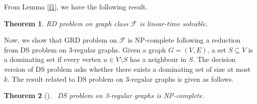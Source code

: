 \documentclass[preprint,12pt]{elsarticle}
\newcommand{\ds}{{\sc Dominating Set}}
\newtheorem{theorem}{Theorem}[section]
\begin{document}
From Lemma \ref{f1}, we have the following result.
\begin{theorem}
    RD problem on graph class $\mathcal{F}$ is linear-time solvable.
\end{theorem}
Now, we show that GRD problem on  $\mathcal{F}$ is NP-complete following a reduction from DS problem on $3$-regular graphs. Given a graph $G = (V, E)$, a set $S \subseteq V$ is a dominating set if every vertex $u \in V\setminus S$ has a neighbour in $S$. The decision version of DS problem asks whether there exists a dominating set of size at most $k$.
The result related to DS problem on 3-regular graphs is given as follows.
\begin{theorem}[\cite{Kikuno}]~\label{ds_3r}
    DS problem on 3-regular graphs is NP-complete.
\end{theorem}
\end{document}
